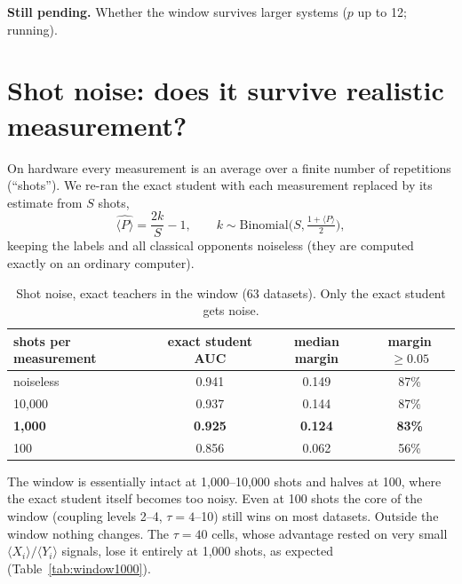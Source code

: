 \documentclass[11pt]{article}
\begin{document}
\textbf{Still pending.} Whether the window survives larger systems ($p$ up to 12; running).

\section{Shot noise: does it survive realistic measurement?}

On hardware every measurement is an average over a finite number of repetitions (``shots''). We re-ran the
exact student with each measurement replaced by its estimate from $S$ shots,
\begin{equation}
\widehat{\langle P\rangle}=\frac{2k}{S}-1,\qquad k\sim\mathrm{Binomial}\Big(S,\tfrac{1+\langle P\rangle}{2}\Big),
\end{equation}
keeping the labels and all classical opponents noiseless (they are computed exactly on an ordinary computer).

\begin{table}[H]\centering\small
\caption{Shot noise, exact teachers in the window (63 datasets). Only the exact student gets noise.}\label{tab:shots}
\begin{tabular}{@{}lccc@{}}\toprule
shots per measurement & exact student AUC & median margin & margin $\ge0.05$\\\midrule
noiseless & 0.941 & 0.149 & 87\%\\
10{,}000 & 0.937 & 0.144 & 87\%\\
\textbf{1{,}000} & \textbf{0.925} & \textbf{0.124} & \textbf{83\%}\\
100 & 0.856 & 0.062 & 56\%\\\bottomrule
\end{tabular}
\end{table}

The window is essentially intact at 1{,}000--10{,}000 shots and halves at 100, where the exact student itself
becomes too noisy. Even at 100 shots the core of the window (coupling levels 2--4, $\tau=4$--10) still wins on
most datasets. Outside the window nothing changes. The $\tau=40$ cells, whose advantage rested on very small
$\langle X_i\rangle/\langle Y_i\rangle$ signals, lose it entirely at 1{,}000 shots, as expected
(Table~\ref{tab:window1000}).
\end{document}
